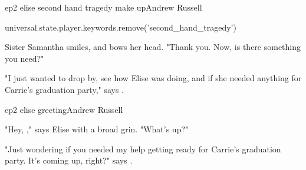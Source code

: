 \documentclass{book}
\begin{document}
\begin{childnode}{ep2 elise second hand tragedy make up}{Andrew Russell}

    \begin{code}

        universal.state.player.keywords.remove('second\_hand\_tragedy')

    \end{code}

    Sister Samantha smiles, and bows her head. "Thank you. Now, is there something you need?"

    "I just wanted to drop by, see how Elise was doing, and if she needed anything for Carrie's graduation party," says \name{}.


\end{childnode}

\begin{childnode}{ep2 elise greeting}{Andrew Russell}

    "Hey, \nickname{}," says Elise with a broad grin. "What's up?"

    "Just wondering if you needed my help getting ready for Carrie's graduation party. It's coming up, right?" says \name{}.


\end{childnode}
\end{document}
